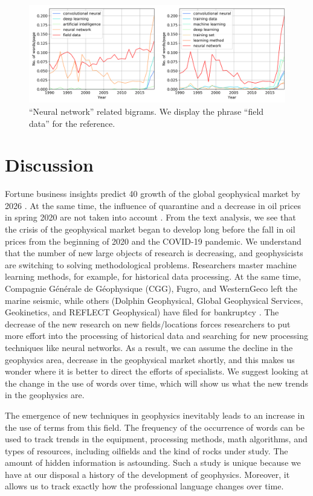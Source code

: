 \documentclass[geosciences,article,submit,moreauthors,pdftex]{Definitions/mdpi}
\begin{document}
\begin{figure}[ht!]
\includegraphics[width=\textwidth]{nn_related_all.png} 
\caption{``Neural network'' related bigrams. We display the phrase ``field data'' for the reference.}
\label{neur_netw}
\end{figure}


\section{Discussion}

Fortune business insights predict 40 growth of the global geophysical market by 2026 \citep{FBI2019}. At the same time, the influence of quarantine and a decrease in oil prices in spring 2020 are not taken into account \citep{Almon2020}. From the text analysis, we see that the crisis of the geophysical market began to develop long before the fall in oil prices from the beginning of 2020 and the COVID-19 pandemic. We understand that the number of new large objects of research is decreasing, and geophysicists are switching to solving methodological problems. Researchers master machine learning methods, for example, for historical data processing. At the same time, Compagnie Générale de Géophysique (CGG), Fugro, and WesternGeco left the marine seismic, while others (Dolphin Geophysical, Global Geophysical Services, Geokinetics, and REFLECT Geophysical) have filed for bankruptcy \citep{Offmag2019}. The decrease of the new research on new fields/locations forces researchers to put more effort into the processing of historical data and searching for new processing techniques like neural networks. As a result, we can assume the decline in the geophysics area, decrease in the geophysical market shortly, and this makes us wonder where it is better to direct the efforts of specialists. We suggest looking at the change in the use of words over time, which will show us what the new trends in the geophysics are.


The emergence of new techniques in geophysics inevitably leads to an increase in the use of terms from this field. The frequency of the occurrence of words can be used to track trends in the equipment, processing methods, math algorithms, and types of resources, including oilfields and the kind of rocks under study. The amount of hidden information is astounding. Such a study is unique because we have at our disposal a history of the development of geophysics. Moreover, it allows us to track exactly how the professional language changes over time.
\end{document}
